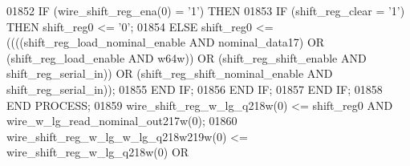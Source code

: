 \begin{DoxyCode}
{01852             \textcolor{keywordflow}{IF} \textcolor{vhdlchar}{(}\textcolor{vhdlchar}{wire_shift_reg_ena}\textcolor{vhdlchar}{(}\textcolor{vhdllogic}{}\textcolor{vhdllogic}{0}\textcolor{vhdlchar}{)} \textcolor{vhdlchar}{=} \textcolor{vhdlchar}{'}\textcolor{vhdllogic}{}\textcolor{vhdllogic}{1}\textcolor{vhdlchar}{'}\textcolor{vhdlchar}{)} \textcolor{keywordflow}{THEN} 
01853                 \textcolor{keywordflow}{IF} \textcolor{vhdlchar}{(}\textcolor{vhdlchar}{shift_reg_clear} \textcolor{vhdlchar}{=} \textcolor{vhdlchar}{'}\textcolor{vhdllogic}{}\textcolor{vhdllogic}{1}\textcolor{vhdlchar}{'}\textcolor{vhdlchar}{)} \textcolor{keywordflow}{THEN} \textcolor{vhdlchar}{shift_reg0} \textcolor{vhdlchar}{<=} \textcolor{vhdlchar}{'}\textcolor{vhdllogic}{}\textcolor{vhdllogic}{0}\textcolor{vhdlchar}{'};
01854                 \textcolor{keywordflow}{ELSE} \textcolor{vhdlchar}{shift_reg0} \textcolor{vhdlchar}{<=} \textcolor{vhdlchar}{(}\textcolor{vhdlchar}{(}\textcolor{vhdlchar}{(}\textcolor{vhdlchar}{(}\textcolor{vhdlchar}{shift_reg_load_nominal_enable} \textcolor{keywordflow}{AND} \textcolor{vhdlchar}{
      nominal_data17}\textcolor{vhdlchar}{)} \textcolor{keywordflow}{OR} \textcolor{vhdlchar}{(}\textcolor{vhdlchar}{shift_reg_load_enable} \textcolor{keywordflow}{AND} \textcolor{vhdlchar}{w64w}\textcolor{vhdlchar}{)}\textcolor{vhdlchar}{)} \textcolor{keywordflow}{OR} \textcolor{vhdlchar}{(}\textcolor{vhdlchar}{shift_reg_shift_enable} \textcolor{keywordflow}{AND} \textcolor{vhdlchar}{
      shift_reg_serial_in}\textcolor{vhdlchar}{)}\textcolor{vhdlchar}{)} \textcolor{keywordflow}{OR} \textcolor{vhdlchar}{(}\textcolor{vhdlchar}{shift_reg_shift_nominal_enable} \textcolor{keywordflow}{AND} \textcolor{vhdlchar}{shift_reg_serial_in}\textcolor{vhdlchar}{)}\textcolor{vhdlchar}{)};
01855                 \textcolor{keywordflow}{END} \textcolor{keywordflow}{IF};
01856             \textcolor{keywordflow}{END} \textcolor{keywordflow}{IF};
01857         \textcolor{keywordflow}{END} \textcolor{keywordflow}{IF};
01858     \textcolor{keywordflow}{END} \textcolor{keywordflow}{PROCESS};
01859     \textcolor{vhdlchar}{wire_shift_reg_w_lg_q218w}\textcolor{vhdlchar}{(}\textcolor{vhdllogic}{}\textcolor{vhdllogic}{0}\textcolor{vhdlchar}{)} \textcolor{vhdlchar}{<=} \textcolor{vhdlchar}{shift_reg0} \textcolor{keywordflow}{AND} \textcolor{vhdlchar}{
      wire_w_lg_read_nominal_out217w}\textcolor{vhdlchar}{(}\textcolor{vhdllogic}{}\textcolor{vhdllogic}{0}\textcolor{vhdlchar}{)};
01860     \textcolor{vhdlchar}{wire_shift_reg_w_lg_w_lg_q218w219w}\textcolor{vhdlchar}{(}\textcolor{vhdllogic}{}\textcolor{vhdllogic}{0}\textcolor{vhdlchar}{)} \textcolor{vhdlchar}{<=} \textcolor{vhdlchar}{wire_shift_reg_w_lg_q218w}\textcolor{vhdlchar}{(}\textcolor{vhdllogic}{}\textcolor{vhdllogic}{0}\textcolor{vhdlchar}{)} \textcolor{keywordflow}{OR} \textcolor{vhdlchar}{
}}
\end{DoxyCode}
